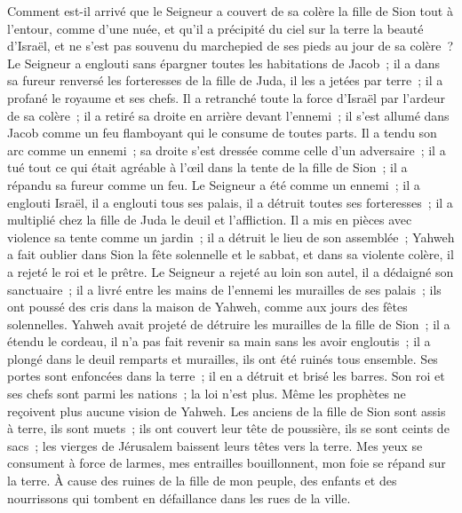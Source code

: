 \begin{multicols}{2}
\VerseOne{} Comment est-il arrivé que le Seigneur a couvert de sa colère la fille de Sion tout à l'entour, comme d'une nuée, et qu'il a précipité du ciel sur la terre la beauté d'Israël, et ne s'est pas souvenu du marchepied de ses pieds au jour de sa colère~?
 Le Seigneur a englouti sans épargner toutes les habitations de Jacob~; il a dans sa fureur renversé les forteresses de la fille de Juda, il les a jetées par terre~; il a profané le royaume et ses chefs.
 Il a retranché toute la force d'Israël par l'ardeur de sa colère~; il a retiré sa droite en arrière devant l'ennemi~; il s'est allumé dans Jacob comme un feu flamboyant qui le consume de toutes parts.
 Il a tendu son arc comme un ennemi~; sa droite s'est dressée comme celle d'un adversaire~; il a tué tout ce qui était agréable à l'œil dans la tente de la fille de Sion~; il a répandu sa fureur comme un feu.
 Le Seigneur a été comme un ennemi~; il a englouti Israël, il a englouti tous ses palais, il a détruit toutes ses forteresses~; il a multiplié chez la fille de Juda le deuil et l'affliction.
 Il a mis en pièces avec violence sa tente comme un jardin~; il a détruit le lieu de son assemblée~; Yahweh a fait oublier dans Sion la fête solennelle et le sabbat, et dans sa violente colère, il a rejeté le roi et le prêtre.
 Le Seigneur a rejeté au loin son autel, il a dédaigné son sanctuaire~; il a livré entre les mains de l'ennemi les murailles de ses palais~; ils ont poussé des cris dans la maison de Yahweh, comme aux jours des fêtes solennelles.
 Yahweh avait projeté de détruire les murailles de la fille de Sion~; il a étendu le cordeau, il n'a pas fait revenir sa main sans les avoir engloutis~; il a plongé dans le deuil remparts et murailles, ils ont été ruinés tous ensemble.
 Ses portes sont enfoncées dans la terre~; il en a détruit et brisé les barres. Son roi et ses chefs sont parmi les nations~; la loi n'est plus. Même les prophètes ne reçoivent plus aucune vision de Yahweh.
 Les anciens de la fille de Sion sont assis à terre, ils sont muets~; ils ont couvert leur tête de poussière, ils se sont ceints de sacs~; les vierges de Jérusalem baissent leurs têtes vers la terre.
 Mes yeux se consument à force de larmes, mes entrailles bouillonnent, mon foie se répand sur la terre. À cause des ruines de la fille de mon peuple, des enfants et des nourrissons qui tombent en défaillance dans les rues de la ville.

\end{multicols}
